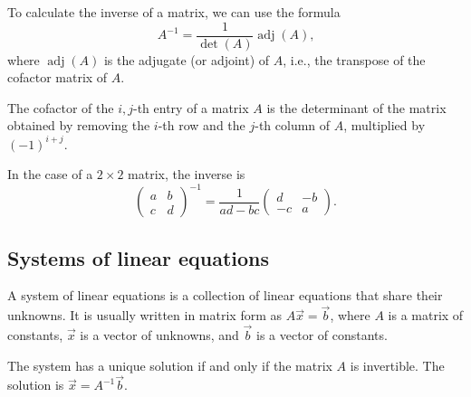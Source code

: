 To calculate the inverse of a matrix, we can use the formula
\[
  A^{-1} = \frac{1}{\det(A)} \operatorname{adj}(A)\text{,}
\]
where $\operatorname{adj}(A)$ is the adjugate (or adjoint) of $A$, i.e., the transpose of the cofactor matrix
of $A$.

The cofactor of the $i, j$-th entry of a matrix $A$ is the determinant of the matrix
obtained by removing the $i$-th row and the $j$-th column of $A$, multiplied by $(-1)^{i
+ j}$.

In the case of a $2 \times 2$ matrix, the inverse is
\[
  \begin{pmatrix}
    a & b \\
    c & d
  \end{pmatrix}^{-1} = \frac{1}{ad - bc}
  \begin{pmatrix}
    d & -b \\
    -c & a
  \end{pmatrix}\text{.}
\]

\subsection{Systems of linear equations}

A system of linear equations is a collection of linear equations that share their
unknowns.  It is usually written in matrix form as $A \vec{x} = \vec{b}$, where $A$ is a
matrix of constants, $\vec{x}$ is a vector of unknowns, and $\vec{b}$ is a vector of
constants.

The system has a unique solution if and only if the matrix $A$ is invertible.  The
solution is $\vec{x} = A^{-1} \vec{b}$.

